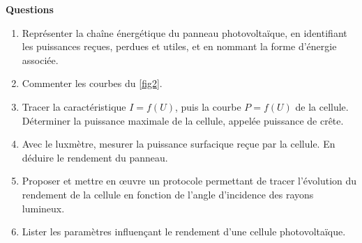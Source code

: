 \documentclass[a4paper,11pt,fleqn]{scrartcl}%
\begin{document}
\noindent \colorbox{blue!10}{
    \begin{minipage}{.98\linewidth}
    \centering  \textcolor{purple!50!blue!70}{\Large \textbf{Questions}}
    \begin{enumerate}
        \item Représenter la chaîne énergétique du panneau photovoltaïque, en identifiant les puissances reçues, perdues et utiles, et en nommant la forme d'énergie associée.
        \item Commenter les courbes du \ref{fig2}.
        \item Tracer la caractéristique $I=f(U)$, puis la courbe $P=f(U)$ de la cellule. Déterminer la puissance maximale de la cellule, appelée puissance de crête.
        \item Avec le  luxmètre, mesurer la puissance surfacique reçue par la cellule. En déduire le rendement du panneau.
        \item Proposer et mettre en \oe uvre un protocole permettant de tracer l'évolution du rendement de la cellule en fonction de l'angle d'incidence des rayons lumineux.
        \item Lister les paramètres influençant le rendement d'une cellule photovoltaïque.
    \end{enumerate}
    \end{minipage}
}
\end{document}
